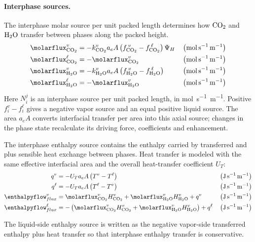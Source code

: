 \paragraph{Interphase sources.}
The interphase molar source per unit packed length determines how $\COtwo$ and $\HtwoO$ transfer between phases along the packed height.
\begin{align}
\molarflux^{\vap}_{ \COtwo} &=  -k^{\vap}_{ \COtwo}  a_e A  \left(f^{\:\vap}_{ \COtwo} - f^{\:\liq}_{ \COtwo}\right) \Psi _{H} && \left(\unit{mol\,s^{-1}\,m^{-1}}\right) \\
\molarflux^{\liq}_{ \COtwo} &= -\molarflux^{\vap}_{ \COtwo} && \left(\unit{mol\,s^{-1}\,m^{-1}}\right) \\
\molarflux^{\vap}_{ \HtwoO} &= -k^{\vap}_{ \HtwoO} a_e A \left(f^{\:\vap}_{ \HtwoO} - f^{\:\liq}_{ \HtwoO}\right)  && \left(\unit{mol\,s^{-1}\,m^{-1}}\right) \\
\molarflux^{\liq}_{ \HtwoO} &= -\molarflux^{\vap}_{ \HtwoO} && \left(\unit{mol\,s^{-1}\,m^{-1}}\right)
\end{align}
Here $N_i^j$ is an interphase source per unit packed length, in \unit{mol.s^{-1}.m^{-1}}.
Positive $f_i^v-f_i^\ell$ gives a negative vapor source and an equal positive liquid source.
The area $a_eA$ converts interfacial transfer per area into this axial source; changes in the phase state recalculate its driving force, coefficients and enhancement.


The interphase enthalpy source contains the enthalpy carried by transferred \COtwo{} and \HtwoO{} plus sensible heat exchange between phases.
Heat transfer is modeled with the same effective interfacial area and the overall heat-transfer coefficient $U_T$:
\begin{align}
q^{\vap} &= -U_T a_e A \left(T^{\vap}-T^{\liq}\right) && \left(\unit{J\,s^{-1}\,m^{-1}}\right) \\
q^{\liq} &= -U_T a_e A \left(T^{\liq}-T^{\vap}\right) && \left(\unit{J\,s^{-1}\,m^{-1}}\right) \\
\enthalpyflow^{\vap}_{flux} &=   \molarflux^{\vap}_{ \COtwo}H^{\vap}_{ \COtwo} + \molarflux^{\vap}_{ \HtwoO}H^{\vap}_{ \HtwoO} +  q^{\vap} && \left(\unit{J\,s^{-1}\,m^{-1}}\right) \\
\enthalpyflow^{\liq}_{flux} &= -\left(\molarflux^{\vap}_{ \COtwo}H^{\vap}_{ \COtwo} + \molarflux^{\vap}_{ \HtwoO}H^{\vap}_{ \HtwoO}\right) +  q^{\liq} && \left(\unit{J\,s^{-1}\,m^{-1}}\right)
\end{align}

The liquid-side enthalpy source is written as the negative vapor-side transferred enthalpy plus heat transfer so that interphase enthalpy transfer is conservative.

